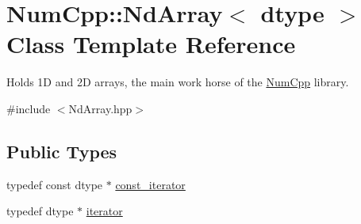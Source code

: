 \hypertarget{class_num_cpp_1_1_nd_array}{}\section{Num\+Cpp\+:\+:Nd\+Array$<$ dtype $>$ Class Template Reference}
\label{class_num_cpp_1_1_nd_array}


Holds 1D and 2D arrays, the main work horse of the \mbox{\hyperlink{namespace_num_cpp}{Num\+Cpp}} library.  




{\ttfamily \#include $<$Nd\+Array.\+hpp$>$}

\subsection*{Public Types}
\begin{DoxyCompactItemize}
\item 
typedef const dtype $\ast$ \mbox{\hyperlink{class_num_cpp_1_1_nd_array_a770eaf3b67efaa19e310ed14eee5aabb}{const\+\_\+iterator}}
\item 
typedef dtype $\ast$ \mbox{\hyperlink{class_num_cpp_1_1_nd_array_ac56493775d6c0ff556ed7d6c9e7c07b4}{iterator}}
\end{DoxyCompactItemize}
